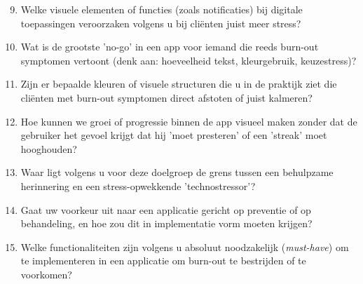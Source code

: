 \documentclass{hogent-article}
\begin{document}
\begin{description}
        \vspace{1em}
        
        \item[Design \& stressfactoren (UI/UX)] \hfill
        \begin{enumerate}
            \setcounter{enumi}{8}
            \item Welke visuele elementen of functies (zoals notificaties) bij digitale toepassingen veroorzaken volgens u bij cliënten juist meer stress?
            \item Wat is de grootste 'no-go' in een app voor iemand die reeds burn-out symptomen vertoont (denk aan: hoeveelheid tekst, kleurgebruik, keuzestress)?
            \item Zijn er bepaalde kleuren of visuele structuren die u in de praktijk ziet die cliënten met burn-out symptomen direct afstoten of juist kalmeren?
            \item Hoe kunnen we groei of progressie binnen de app visueel maken zonder dat de gebruiker het gevoel krijgt dat hij 'moet presteren' of een 'streak' moet hooghouden?
            \item Waar ligt volgens u voor deze doelgroep de grens tussen een behulpzame herinnering en een stress-opwekkende 'technostressor'?
        \end{enumerate}
        
        \vspace{1em}
        
        \item[Implementatie \& functionaliteiten] \hfill
        \begin{enumerate}
            \setcounter{enumi}{13}
            \item Gaat uw voorkeur uit naar een applicatie gericht op preventie of op behandeling, en hoe zou dit in implementatie vorm moeten krijgen?
            \item Welke functionaliteiten zijn volgens u absoluut noodzakelijk (\textit{must-have}) om te implementeren in een applicatie om burn-out te bestrijden of te voorkomen?
        \end{enumerate}
    \end{description}
\end{document}
